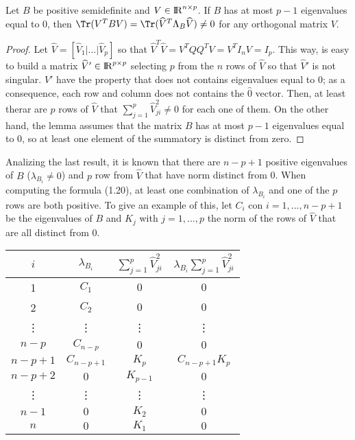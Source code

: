 \begin{lemma}\label{lemma2.4}
Let $B$ be positive semidefinite and $V \in {\rm I\!R}^{n\times p}$. If $B$ has at most $p-1$ eigenvalues equal to $0$, then $\Tr(V^T B V)  = \Tr(\widehat{V}^T \Lambda_{B} \widehat{V}) \neq 0$  for any orthogonal matrix $V$.
\end{lemma}

\begin{proof}
Let $\widehat{V} = [\widehat{V}_1 | ... | \widehat{V}_p]$ so that $\widehat{V}^T \widehat{V} = V^T Q Q^T V = V^T I_n V  = I_p$. This way, is easy to build a matrix $\widehat{V}' \in {\rm I\!R}^{p \times p}$ selecting $p$ from the $n$ rows of $\widehat{V}$ so that $\widehat{V}'$ is not singular. $\widehat{V}'$ have the property that does not contains eigenvalues equal to 0; as a consequence, each row and column does not contains the $\widehat{0}$ vector. Then, at least therar are $p$ rows of $\widehat{V}$ that $\sum_{j=1}^{p}\widehat{V}_{ji}^2 \neq 0$ for each one of them. On the other hand, the lemma assumes that the matrix $B$ has at most $p-1$ eigenvalues equal to $0$, so at least one element of the summatory is distinct from zero.
\end{proof}

Analizing the last result, it is known that there are $n-p+1$ positive eigenvalues of $B$ ($\lambda_{B_i} \neq 0$) and $p$ row from $\widehat{V}$ that have norm distinct from 0. When computing the formula (1.20), at least one combination of $\lambda_{B_i}$ and one of the $p$ rows are both positive. To give an example of this, let $C_i$ con $i = 1, ... , n-p+1$ be the eigenvalues of $B$ and $K_j$ with $j = 1, ... , p$ the norm of the rows of $\widehat{V}$ that are all distinct from $0$.
 
\begin{center}
\begin{tabular}{ | c | c|  c | c|} 
\hline
$i$ & $\lambda_{B_i}$ & $\sum \limits_{j=1}^{p} \widehat{V}_{ji}^2$  & $\lambda_{B_i} \sum \limits_{j=1}^{p} \widehat{V}_{ji}^2$ \\ 
\hline
\hline
1 & $C_1$ & $0$ & $0$ \\ 
\hline
2 & $C_2$ & $0$ & $0$ \\ 
\hline
\vdots & \vdots & \vdots & \vdots \\ 
\hline
$n-p$ & $C_{n-p}$ & $0$ &  $0$\\ 
\hline
$n-p+1$ & $C_{n-p+1}$ & $K_{p}$ &  $C_{n-p+1} K_{p}$\\ 
\hline
$n-p+2$ & $0$ & $K_{p-1}$  & $0$ \\ 
\hline
\vdots & \vdots & \vdots & \vdots  \\ 
\hline
$n-1$ & $0$ & $K_2$ & $0$ \\ 
\hline
$n$ & $0$ & $K_1$ & $0$ \\ 
\hline
\hline

\end{tabular}
\end{center}

